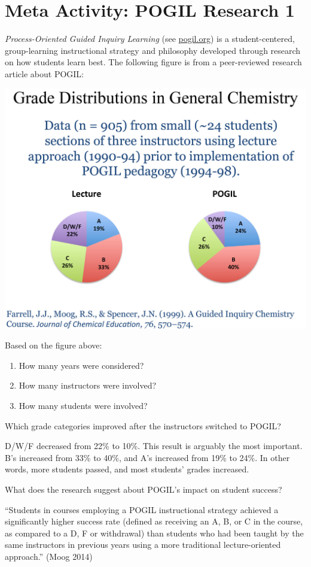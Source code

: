 \section*{Meta Activity: POGIL Research 1}

\textit{Process-Oriented Guided Inquiry Learning} (see \href{https://pogil.org/}{pogil.org}) is a student-centered, group-learning instructional strategy and philosophy developed through research on how students learn best.
The following figure is from a peer-reviewed research article about POGIL:

\begin{center}
\includegraphics[width=0.60\linewidth]{pogil-grades.png}
\end{center}




\Q Based on the figure above:

\begin{enumerate}
\item How many years were considered? 
\item How many instructors were involved? 
\item How many students were involved? 
\end{enumerate}
\vspace{-1em}


\Q Which grade categories improved after the instructors switched to POGIL?

\begin{answer}
D/W/F decreased from 22\% to 10\%. This result is arguably the most important.
B's increased from 33\% to 40\%, and A's increased from 19\% to 24\%.
In other words, more students passed, and most students' grades increased.
\end{answer}


\Q What does the research suggest about POGIL's impact on student success?

\begin{answer}[5em]
``Students in courses employing a POGIL instructional strategy achieved a significantly higher success rate (defined as receiving an A, B, or C in the course, as compared to a D, F or withdrawal) than students who had been taught by the same instructors in previous years using a more traditional lecture-oriented approach.'' (Moog 2014)
\end{answer}
